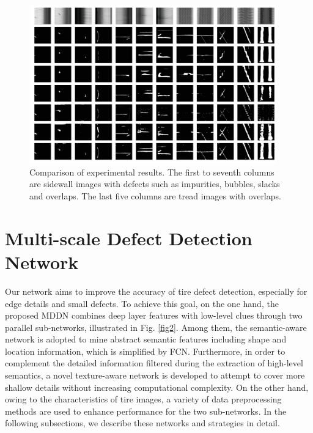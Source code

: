 \documentclass{article}
\begin{document}
\begin{figure}[t]
  \centering
  \centerline{\includegraphics[width=0.95\textwidth]{pic3.eps}}
  \caption{Comparison of experimental results. The first to seventh columns are sidewall images with defects such as impurities, bubbles, slacks and overlaps. The last five columns are tread images with overlaps.}
  \label{fig3}
\end{figure}
\section{Multi-scale Defect Detection Network}
\label{sec:format}

Our network aims to improve the accuracy of tire defect detection, especially for edge details and small defects. To achieve this goal, on the one hand, the proposed MDDN combines deep layer features with low-level clues through two parallel sub-networks, illustrated in Fig. \ref{fig2}. Among them, the semantic-aware network is adopted to mine abstract semantic features including shape and location information, which is simplified by FCN. Furthermore, in order to complement the detailed information filtered during the extraction of high-level semantics, a novel texture-aware network is developed to attempt to cover more shallow details without increasing computational complexity. On the other hand, owing to the characteristics of tire images, a variety of data preprocessing methods are used to enhance performance for the two sub-networks. In the following subsections, we describe these networks and strategies in detail.
\end{document}
